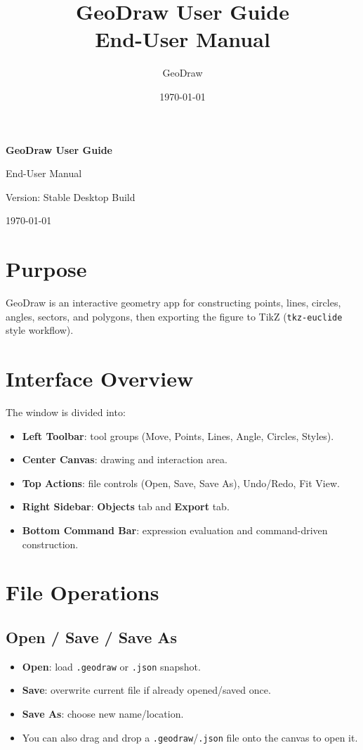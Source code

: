 \documentclass[11pt,a4paper]{article}
\title{\textbf{GeoDraw User Guide}\\\large End-User Manual}
\author{GeoDraw}
\date{\today}
\begin{document}
\begin{titlepage}
  \centering
  {\Huge\bfseries GeoDraw User Guide\par}
  \vspace{0.6em}
  {\Large End-User Manual\par}
  \vspace{2em}
  {\large Version: Stable Desktop Build\par}
  \vfill
  {\large \today\par}
\end{titlepage}
\tableofcontents
\bigskip

\section{Purpose}
GeoDraw is an interactive geometry app for constructing points, lines, circles, angles, sectors, and polygons, then exporting the figure to TikZ (\texttt{tkz-euclide} style workflow).

\section{Interface Overview}
The window is divided into:
\begin{itemize}[leftmargin=1.5em]
  \item \textbf{Left Toolbar}: tool groups (Move, Points, Lines, Angle, Circles, Styles).
  \item \textbf{Center Canvas}: drawing and interaction area.
  \item \textbf{Top Actions}: file controls (Open, Save, Save As), Undo/Redo, Fit View.
  \item \textbf{Right Sidebar}: \textbf{Objects} tab and \textbf{Export} tab.
  \item \textbf{Bottom Command Bar}: expression evaluation and command-driven construction.
\end{itemize}


\section{File Operations}
\subsection{Open / Save / Save As}
\begin{itemize}[leftmargin=1.5em]
  \item \textbf{Open}: load \texttt{.geodraw} or \texttt{.json} snapshot.
  \item \textbf{Save}: overwrite current file if already opened/saved once.
  \item \textbf{Save As}: choose new name/location.
  \item You can also drag and drop a \texttt{.geodraw}/\texttt{.json} file onto the canvas to open it.
\end{itemize}
\end{document}
